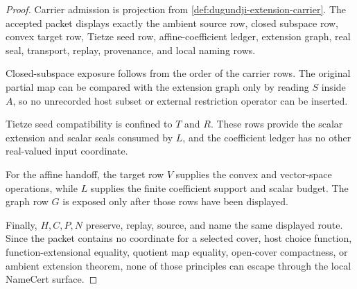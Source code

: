 \begin{proof}
Carrier admission is projection from \autoref{def:dugundji-extension-carrier}. The accepted packet displays exactly the ambient source row, closed subspace row, convex target row, Tietze seed row, affine-coefficient ledger, extension graph, real seal, transport, replay, provenance, and local naming rows.

Closed-subspace exposure follows from the order of the carrier rows. The original partial map can be compared with the extension graph only by reading $S$ inside $A$, so no unrecorded host subset or external restriction operator can be inserted.

Tietze seed compatibility is confined to $T$ and $R$. These rows provide the scalar extension and scalar seals consumed by $L$, and the coefficient ledger has no other real-valued input coordinate.

For the affine handoff, the target row $V$ supplies the convex and vector-space operations, while $L$ supplies the finite coefficient support and scalar budget. The graph row $G$ is exposed only after those rows have been displayed.

Finally, $H,C,P,N$ preserve, replay, source, and name the same displayed route. Since the packet contains no coordinate for a selected cover, host choice function, function-extensional equality, quotient map equality, open-cover compactness, or ambient extension theorem, none of those principles can escape through the local NameCert surface.
\end{proof}

